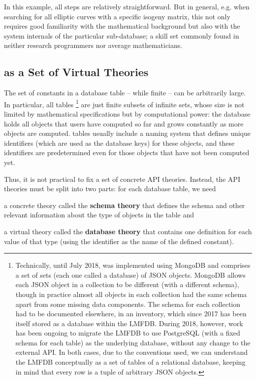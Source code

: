 In this example, all steps are relatively straightforward. 
But in general, e.g. when searching for all elliptic curves with a specific isogeny matrix, this not only requires good familiarity with the mathematical background but also with the system internals of the particular \lmfdb sub-database; a skill set commonly found in neither research programmers nor average mathematicians.   

 \subsection[Virtual Theories]{\lmfdb as a Set of Virtual Theories}\label{sec:vt}

 The set of constants in a database table -- while finite -- can be arbitrarily large.
In particular, all \lmfdb tables%
\footnote{Technically, until July 2018, \lmfdb was implemented using MongoDB and comprises a set of sets (each one called a database) of JSON objects.
MongoDB allows each JSON object in a collection to be different (with a different schema), though in practice almost all objects in each collection had the same schema apart from some missing data components.
The schema for each collection had to be documented elsewhere, in an inventory, which since 2017 has been itself stored as a database within the LMFDB.
During 2018, however, work has been ongoing to migrate the LMFDB to use PostgreSQL (with a fixed schema for each table) as the underlying database, without any change to the external API.
In both cases, due to the conventions used, we can understand the LMFDB conceptually as a set of tables of a relational database, keeping in mind that every row is a tuple of arbitrary JSON objects.}
are just finite subsets of infinite sets, whose size is not limited by mathematical specifications but by computational power: the database holds all objects that users have computed so far and grows constantly as more objects are computed.
\lmfdb tables usually include a naming system that defines unique identifiers (which are used as the database keys) for these objects, and these identifiers are predetermined even for those objects that have not been computed yet.

Thus, it is not practical to fix a set of concrete API theories.
Instead, the API theories must be split into two parts: for each database table, we need
\begin{compactitem}
  \item a concrete theory called the \textbf{schema theory} that defines the schema  and other relevant information about the type of objects in the table and
  \item a virtual theory called the \textbf{database theory} that contains one definition for each value of that type (using the \lmfdb identifier as the name of the defined constant). 
\end{compactitem}

